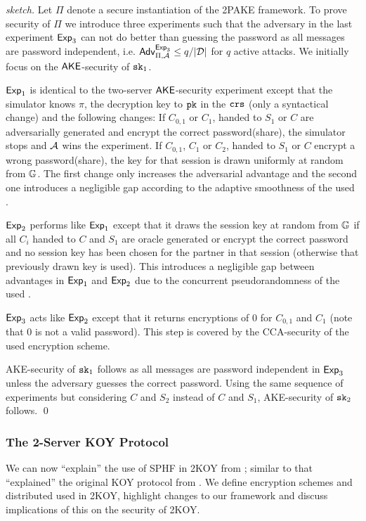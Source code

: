 \begin{proof}[sketch]
Let $\Pi$ denote a secure instantiation of the 2PAKE framework.
To prove security of $\Pi$ we introduce three experiments such that the adversary in the last experiment $\mathsf{Exp}_3$ can not do better than guessing the password as all messages are password independent, i.e. $\mathsf{Adv}_{\Pi,\mathcal{A}}^{\mathsf{Exp}_3}\leq q/|\mathcal{D}|$ for $q$ active attacks.
We initially focus on the $\mathsf{AKE}$-security of $\mathtt{sk}_1$.

$\mathsf{Exp}_1$ is identical to the two-server $\mathsf{AKE}$-security experiment except that the simulator knows $\pi$, the decryption key to $\mathtt{pk}$ in the $\mathtt{crs}$ (only a syntactical change) and the following changes:
If $C_{0,1}$ or $C_{1}$, handed to $S_1$ or $C$ are adversarially generated and encrypt the correct password(share), the simulator stops and $\mathcal{A}$ wins the experiment.
If $C_{0,1}$, $C_1$ or $C_2$, handed to $S_1$ or $C$ encrypt a wrong password(share), the key for that session is drawn uniformly at random from $\mathbb{G}$.
The first change only increases the adversarial advantage and the second one introduces a negligible gap according to the adaptive smoothness of the used \SPHFF.

$\mathsf{Exp}_2$ performs like $\mathsf{Exp}_1$ except that it draws the session key at random from $\mathbb{G}$ if all $C_i$ handed to $C$ and $S_1$ are oracle generated or encrypt the correct password and no session key has been chosen for the partner in that session (otherwise that previously drawn key is used).
This introduces a negligible gap between advantages in $\mathsf{Exp}_1$ and $\mathsf{Exp}_2$ due to the concurrent pseudorandomness of the used \SPHFF.

$\mathsf{Exp}_3$ acts like $\mathsf{Exp}_2$ except that it returns encryptions of $0$ for $C_{0,1}$ and $C_1$ (note that $0$ is not a valid password).
This step is covered by the CCA-security of the used encryption scheme.

AKE-security of $\mathtt{sk}_1$ follows as all messages are password independent in $\mathsf{Exp}_3$ unless the adversary guesses the correct password.
Using the same sequence of experiments but considering $C$ and $S_2$ instead of $C$ and $S_1$, AKE-security of $\mathtt{sk}_2$ follows.
\qed
\end{proof}

\subsubsection{The 2-Server KOY Protocol}\label{sec:twokoy}
We can  now ``explain'' the use of SPHF in 2KOY from \cite{Katz_MacKenzie_Taban_Gligor_2005}; similar to \cite{Gennaro2003} that ``explained'' the original KOY protocol from \cite{Katz_Ostrovsky_Yung_2001}.
We define encryption schemes and distributed \SPHFF used in 2KOY, highlight changes to our framework and discuss implications of this on the security of 2KOY.

